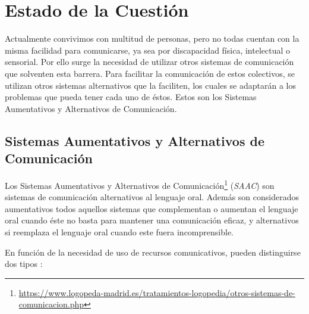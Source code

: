 \chapter{Estado de la Cuestión}
\label{cap:estadoDeLaCuestion}





Actualmente convivimos con multitud de personas, pero no todas cuentan con la misma facilidad para comunicarse, ya sea por discapacidad física, intelectual o sensorial. Por ello surge la necesidad de utilizar otros sistemas de comunicación que solventen esta barrera. Para facilitar la comunicación de estos colectivos, se utilizan otros sistemas alternativos que la faciliten, los cuales se adaptarán a los problemas que pueda tener cada uno de éstos. Estos son los Sistemas Aumentativos y Alternativos de Comunicación.



\section{Sistemas Aumentativos y Alternativos de Comunicación}
\label{cap3:sec:saac}
Los Sistemas Aumentativos y Alternativos de Comunicación\footnote{\url{https://www.logopeda-madrid.es/tratamientos-logopedia/otros-sistemas-de-comunicacion.php}} (\textit{SAAC}) son sistemas de comunicación alternativos al lenguaje oral. Además son considerados aumentativos todos aquellos sistemas que complementan o aumentan el lenguaje oral cuando éste no basta para mantener una comunicación eficaz, y alternativos si reemplaza el lenguaje oral cuando este fuera incomprensible.

En función de la necesidad de uso de recursos comunicativos, pueden distinguirse dos tipos \citep{saac}:

